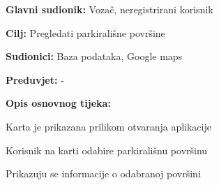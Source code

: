 					\noindent {}
					\begin{packed_item}
						
						\item  \textbf{Glavni sudionik: } Vozač, neregistrirani korisnik
						\item  \textbf{Cilj:} Pregledati parkirališne površine
						\item  \textbf{Sudionici:} Baza podataka, Google maps
						\item  \textbf{Preduvjet:} -
						\item  \textbf{Opis osnovnog tijeka:}
						
						\item[] \begin{packed_enum}
							\item Karta je prikazana prilikom otvaranja aplikacije
							\item Korisnik na karti odabire parkirališnu površinu
							\item Prikazuju se informacije o odabranoj površini
						\end{packed_enum}
						
					\end{packed_item}
					\noindent {}
